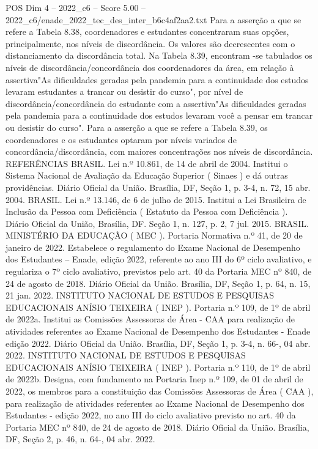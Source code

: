 \begin{textsample}{POS Dim 4 – 2022\_c6 – Score 5.00 – 2022\_c6/enade\_2022\_tec\_des\_inter\_b6c4af2aa2.txt}
Para a asserção a que se refere a Tabela 8.38, coordenadores e estudantes concentraram suas opções, principalmente, nos níveis de discordância.
Os valores são decrescentes com o distanciamento da discordância total.
Na Tabela 8.39, encontram -se tabulados os níveis de discordância/concordância dos coordenadores da área, em relação à assertiva"As dificuldades geradas pela pandemia para a continuidade dos estudos levaram estudantes a trancar ou desistir do curso", por nível de discordância/concordância do estudante com a assertiva"As dificuldades geradas pela pandemia para a continuidade dos estudos levaram você a pensar em trancar ou desistir do curso".
Para a asserção a que se refere a Tabela 8.39, os coordenadores e os estudantes optaram por níveis variados de concordância/discordância, com maiores concentrações nos níveis de discordância.
REFERÊNCIAS BRASIL.
Lei n.º 10.861, de 14 de abril de 2004.
Institui o Sistema Nacional de Avaliação da Educação Superior ( Sinaes ) e dá outras providências.
Diário Oficial da União.
Brasília, DF, Seção 1, p. 3-4, n. 72, 15 abr. 2004.
BRASIL.
Lei n.º 13.146, de 6 de julho de 2015.
Institui a Lei Brasileira de Inclusão da Pessoa com Deficiência ( Estatuto da Pessoa com Deficiência ).
Diário Oficial da União, Brasília, DF.
Seção 1, n. 127, p. 2, 7 jul. 2015.
BRASIL.
MINISTÉRIO DA EDUCAÇÃO ( MEC ).
Portaria Normativa n.º 41, de 20 de janeiro de 2022.
Estabelece o regulamento do Exame Nacional de Desempenho dos Estudantes – Enade, edição 2022, referente ao ano III do 6º ciclo avaliativo, e regulariza o 7º ciclo avaliativo, previstos pelo art. 40 da Portaria MEC nº 840, de 24 de agosto de 2018.
Diário Oficial da União.
Brasília, DF, Seção 1, p. 64, n. 15, 21 jan. 2022.
INSTITUTO NACIONAL DE ESTUDOS E PESQUISAS EDUCACIONAIS ANÍSIO TEIXEIRA ( INEP ).
Portaria n.º 109, de 1º de abril de 2022a.
Institui as Comissões Assessoras de Área - CAA para realização de atividades referentes ao Exame Nacional de Desempenho dos Estudantes - Enade edição 2022.
Diário Oficial da União.
Brasília, DF, Seção 1, p. 3-4, n. 66-, 04 abr. 2022.
INSTITUTO NACIONAL DE ESTUDOS E PESQUISAS EDUCACIONAIS ANÍSIO TEIXEIRA ( INEP ).
Portaria n.º 110, de 1º de abril de 2022b.
Designa, com fundamento na Portaria Inep n.º 109, de 01 de abril de 2022, os membros para a constituição das Comissões Assessoras de Área ( CAA ), para realização de atividades referentes ao Exame Nacional de Desempenho dos Estudantes - edição 2022, no ano III do ciclo avaliativo previsto no art. 40 da Portaria MEC nº 840, de 24 de agosto de 2018.
Diário Oficial da União.
Brasília, DF, Seção 2, p. 46, n. 64-, 04 abr. 2022.

\end{textsample}
